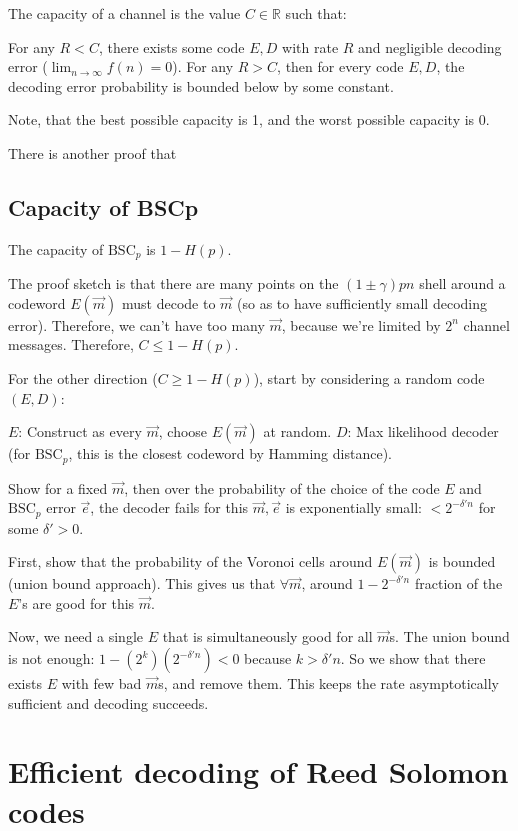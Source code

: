 \documentclass{idc_msc}
\newcommand{\BSC}[1][p]{{\text{BSC}_{#1}}}
\begin{document}
The capacity of a channel is the value \(C \in \mathbb{R}\) such that:

For any \(R < C\), there exists some code \(E, D\) with rate \(R\) and negligible decoding error (\(\lim_{n \to \infty} f(n) = 0\)).
For any \(R > C\), then for every code \(E, D\), the decoding error probability is bounded below by some constant.

Note, that the best possible capacity is 1, and the worst possible capacity is 0.

There is another proof that 

\subsection{Capacity of BSCp}

The capacity of \(\BSC\) is \(1 - H(p)\).

The proof sketch is that there are many points on the \((1 \pm \gamma)pn\) shell around a codeword \(E(\vec{m})\) must decode to \(\vec{m}\) (so as to have sufficiently small decoding error).
Therefore, we can't have too many \(\vec{m}\), because we're limited by \(2^n\) channel messages.
Therefore, \(C \le 1 - H(p)\).

For the other direction (\(C \ge 1 - H(p)\)), start by considering a random code \((E, D)\):

\(E\): Construct as every \(\vec{m}\), choose \(E(\vec{m})\) at random.
\(D\): Max likelihood decoder (for \(\BSC\), this is the closest codeword by Hamming distance).

Show for a fixed \(\vec{m}\), then over the probability of the choice of the code \(E\) and \(\BSC\) error \(\vec{e}\), the decoder fails for this \(\vec{m}, \vec{e}\) is exponentially small: \(< 2^{-\delta'n}\) for some \(\delta' > 0\).

First, show that the probability of the Voronoi cells around \(E(\vec{m})\) is bounded (union bound approach).
This gives us that \(\forall \vec{m}\), around \(1 - 2^{-\delta'n}\) fraction of the \(E\)'s are good for this \(\vec{m}\).

Now, we need a single \(E\) that is simultaneously good for all \(\vec{m}\)s.
The union bound is not enough: \(1 - (2^k)(2^{-\delta'n}) < 0\) because \(k > \delta'n\).
So we show that there exists \(E\) with few bad \(\vec{m}\)s, and remove them.
This keeps the rate asymptotically sufficient and decoding succeeds.


\clearpage
\section{Efficient decoding of Reed Solomon codes}
\end{document}
